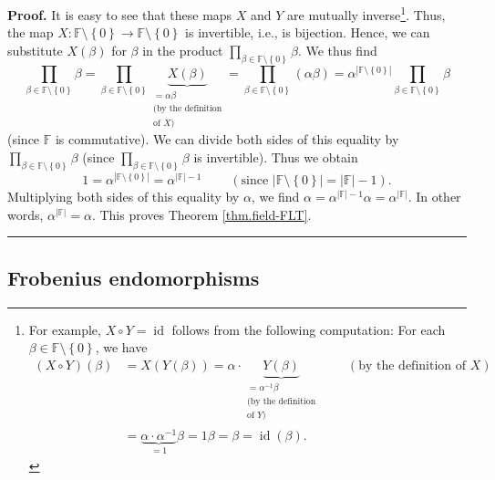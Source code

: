 \documentclass[numbers=enddot,12pt,final,onecolumn,notitlepage]{scrartcl}%
\theoremstyle{definition}
\newenvironment{proof}[1][Proof]{\noindent\textbf{#1.} }{\ \rule{0.5em}{0.5em}}
\let\prodnonlimits\prod
\renewcommand{\prod}{\prodnonlimits\limits}
\begin{document}
\begin{proof}
It is easy to see that these maps $X$ and $Y$ are mutually
inverse\footnote{For example, $X\circ Y=\operatorname*{id}$ follows from the
following computation: For each $\beta\in\mathbb{F}\setminus\left\{
0\right\}  $, we have%
\begin{align*}
\left(  X\circ Y\right)  \left(  \beta\right)   &  =X\left(  Y\left(
\beta\right)  \right)  =\alpha\cdot\underbrace{Y\left(  \beta\right)
}_{\substack{=\alpha^{-1}\beta\\\text{(by the definition}\\\text{of }%
Y\text{)}}}\ \ \ \ \ \ \ \ \ \ \left(  \text{by the definition of }X\right) \\
&  =\underbrace{\alpha\cdot\alpha^{-1}}_{=1}\beta=1\beta=\beta
=\operatorname*{id}\left(  \beta\right)  .
\end{align*}
}. Thus, the map $X:\mathbb{F}\setminus\left\{  0\right\}  \rightarrow
\mathbb{F}\setminus\left\{  0\right\}  $ is invertible, i.e., is bijection.
Hence, we can substitute $X\left(  \beta\right)  $ for $\beta$ in the product
$\prod_{\beta\in\mathbb{F}\setminus\left\{  0\right\}  }\beta$. We thus find%
\[
\prod_{\beta\in\mathbb{F}\setminus\left\{  0\right\}  }\beta=\prod_{\beta
\in\mathbb{F}\setminus\left\{  0\right\}  }\underbrace{X\left(  \beta\right)
}_{\substack{=\alpha\beta\\\text{(by the definition}\\\text{of }X\text{)}%
}}=\prod_{\beta\in\mathbb{F}\setminus\left\{  0\right\}  }\left(  \alpha
\beta\right)  =\alpha^{\left\vert \mathbb{F}\setminus\left\{  0\right\}
\right\vert }\prod_{\beta\in\mathbb{F}\setminus\left\{  0\right\}  }\beta
\]
(since $\mathbb{F}$ is commutative). We can divide both sides of this equality
by $\prod_{\beta\in\mathbb{F}\setminus\left\{  0\right\}  }\beta$ (since
$\prod_{\beta\in\mathbb{F}\setminus\left\{  0\right\}  }\beta$ is invertible).
Thus we obtain%
\[
1=\alpha^{\left\vert \mathbb{F}\setminus\left\{  0\right\}  \right\vert
}=\alpha^{\left\vert \mathbb{F}\right\vert -1}\ \ \ \ \ \ \ \ \ \ \left(
\text{since }\left\vert \mathbb{F}\setminus\left\{  0\right\}  \right\vert
=\left\vert \mathbb{F}\right\vert -1\right)  .
\]
Multiplying both sides of this equality by $\alpha$, we find $\alpha
=\alpha^{\left\vert \mathbb{F}\right\vert -1}\alpha=\alpha^{\left\vert
\mathbb{F}\right\vert }$. In other words, $\alpha^{\left\vert \mathbb{F}%
\right\vert }=\alpha$. This proves Theorem \ref{thm.field-FLT}.
\end{proof}

\subsection{Frobenius endomorphisms}
\end{document}
